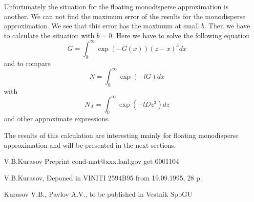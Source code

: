 Unfortunately
the situation for the floating monodisperse approximation is another.
We can not
find the maximum error
of the results for the monodisperse approximation. We see that this error
has the maximum at small $b$.
Then we  have to calculate the situation with $b=0$.
Here we have to solve the following equation
$$
G = \int_0^{\infty} \exp(-G(x)) (z-x)^3 dx
$$
and to compare
$$
N = \int_0^{\infty} \exp(-l G) dx
$$
with
$$
N_A = \int_0^{\infty}
\exp(-l D z^3)        dz
$$
and other approximate expressions.

The results of this calculation are interesting mainly for floating
monodisperse
approximation and will be presented in the next sections.


\begin{thebibliography}{99}

V.B.Kurasov Preprint cond-mat@xxx.lanl.gov get 0001104

V.B.Kurasov, Deponed in VINITI 2594B95 from 19.09.1995, 28 p.


Kurasov V.B., Pavlov A.V., to be published in
Vestnik SpbGU


\end{thebibliography}



\pagebreak

